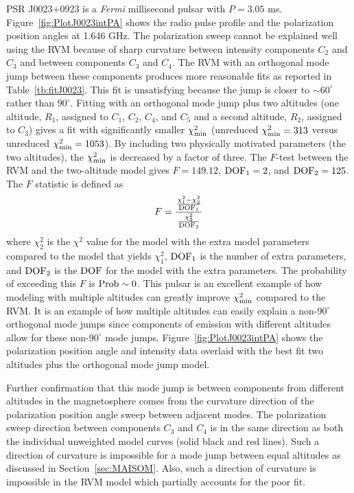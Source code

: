 PSR J0023$+$0923 is a \textit{Fermi} millisecond pulsar with $P=3.05$ ms.  Figure~\ref{fig:PlotJ0023intPA}
shows the radio pulse profile and the polarization position angles at 1.646 GHz.
The polarization sweep cannot be explained well using the RVM because of
sharp curvature between intensity components $C_2$ and $C_3$ 
and between components $C_3$ and $C_4$.  
The RVM with an orthogonal mode jump between these components
produces more reasonable fits as reported in Table~\ref{tb:fitJ0023}.
This fit is unsatisfying because the jump is closer to $\sim 60^\circ$ rather
than $90^\circ$.  Fitting with an orthogonal mode jump plus two 
altitudes (one altitude, $R_{1}$, assigned to $C_1$, $C_2$, $C_4$, and $C_5$
and a second altitude, $R_{2}$, assigned to $C_3$) gives a fit 
with significantly smaller $\chi^2_{\rm{min}}$ 
(unreduced $\chi^2_{\rm{min}}=313$ versus unreduced $\chi^2_{\rm{min}}=1053$). 
By including two physically motivated
parameters (the two altitudes), the $\chi^2_{\rm{min}}$ is decreased by a factor of three.
The $F$-test between the RVM and the two-altitude model gives $F=149.12$, $\rm{DOF}_1=2$, and $\rm{DOF}_2=125$. 
The $F$ statistic is defined as 
\begin{equation}
F=\frac{\frac{\chi^2_1-\chi^2_2}{\rm{DOF}_1}}{\frac{\chi^2_2}{\rm{DOF}_2}}
\end{equation}
where $\chi^2_2$ is the $\chi^2$ value for the model with the extra model
parameters compared to the model that yields $\chi^2_1$, $\rm{DOF}_1$ 
is the number of extra parameters, and $\rm{DOF}_2$ is
the $\rm{DOF}$ for the model with the extra parameters.
The probability of
exceeding this $F$ is $\rm{Prob}\sim 0$.  This pulsar is an excellent
example of how modeling with multiple altitudes can greatly improve $\chi^2_{\rm{min}}$ compared to the RVM.
It is an example of how multiple altitudes can easily explain a non-$90^\circ$ orthogonal mode jumps since
components of emission with different altitudes allow
for these non-$90^\circ$ mode jumps.
Figure~\ref{fig:PlotJ0023intPA} shows the polarization position angle and intensity data
overlaid with the best fit two altitudes plus the orthogonal mode jump model.


Further confirmation that this mode jump is between components from different
altitudes in the magnetosphere comes from the curvature direction of the polarization position 
angle sweep between adjacent modes.
The polarization sweep direction between components $C_3$ and $C_4$ is in the 
same direction as both the individual unweighted model curves (solid black and red lines).
Such a direction of curvature is impossible for a mode jump between equal altitudes as
discussed in Section~\ref{sec:MAISOM}.  Also, such a direction of curvature is impossible
in the RVM model which partially accounts for the poor fit.


